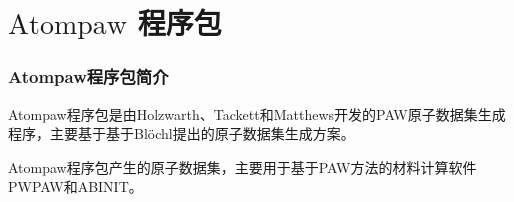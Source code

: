 \documentclass[cjk,slidestop,compress,mathserif,blue]{beamer}
\begin{document}
\section{$\mathrm{Atompaw}$ 程序包}
\frame
{
	\frametitle{\textrm{Atompaw}程序包简介}
	\textrm{Atompaw}程序包是由\textrm{Holzwarth}、\textrm{Tackett}和\textrm{Matthews}开发的\textrm{PAW}原子数据集生成程序，主要基于基于\textrm{Bl\"ochl}提出的原子数据集生成方案。

	\textrm{Atompaw}程序包产生的原子数据集，主要用于基于\textrm{PAW}方法的材料计算软件\textrm{PWPAW}和\textrm{ABINIT}。

}
\end{document}
